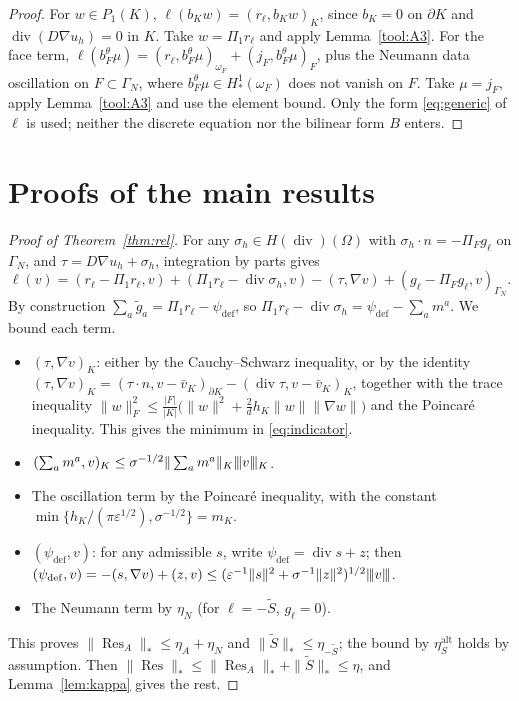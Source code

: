 \documentclass[11pt]{article}
\newcommand{\tnorm}[1]{\lvert\kern-0.25ex\lvert\kern-0.25ex\lvert #1\rvert\kern-0.25ex\rvert\kern-0.25ex\rvert}
\newcommand{\eps}{\varepsilon}
\newcommand{\Res}{\operatorname{Res}}
\newcommand{\Stil}{\tilde S}
\newcommand{\Hdiv}{H(\operatorname{div})}
\newcommand{\dv}{\operatorname{div}}
\newcommand{\defe}{\mathrm{def}}
\theoremstyle{plain}
\theoremstyle{remark}
\numberwithin{equation}{section}
\begin{document}
\begin{proof}
For $w\in P_1(K)$, $\ell(b_Kw)=(r_\ell,b_Kw)_K$, since $b_K=0$ on $\partial K$ and
$\dv(D\nabla u_h)=0$ in $K$. Take $w=\Pi_1r_\ell$ and apply Lemma~\ref{tool:A3}. For the face term,
$\ell(b_F^\theta\mu)=(r_\ell,b_F^\theta\mu)_{\omega_F}+(j_F,b_F^\theta\mu)_F$, plus the Neumann data
oscillation on $F\subset\Gamma_N$, where $b_F^\theta\mu\in H^1_*(\omega_F)$ does not vanish on $F$.
Take $\mu=j_F$, apply Lemma~\ref{tool:A3} and use the element bound. Only the form
\eqref{eq:generic} of $\ell$ is used; neither the discrete equation nor the bilinear form $B$ enters.
\end{proof}

\section{Proofs of the main results}\label{sec:proof}

\begin{proof}[Proof of Theorem~\ref{thm:rel}]
For any $\sigma_h\in\Hdiv(\Omega)$ with $\sigma_h\cdot n=-\Pi_F g_\ell$ on $\Gamma_N$, and
$\tau=D\nabla u_h+\sigma_h$, integration by parts gives
\[
  \ell(v)=(r_\ell-\Pi_1r_\ell,v)+(\Pi_1r_\ell-\dv\sigma_h,v)-(\tau,\nabla v)
  +(g_\ell-\Pi_Fg_\ell,v)_{\Gamma_N}.
\]
By construction $\sum_a\tilde g_a=\Pi_1r_\ell-\psi_\defe$, so
$\Pi_1r_\ell-\dv\sigma_h=\psi_\defe-\sum_am^a$. We bound each term.
\begin{itemize}
  \item $(\tau,\nabla v)_K$: either by the Cauchy--Schwarz inequality, or by the identity
  $(\tau,\nabla v)_K=(\tau\cdot n,v-\bar v_K)_{\partial K}-(\dv\tau,v-\bar v_K)_K$, together with the
  trace inequality $\|w\|_F^2\le\frac{|F|}{|K|}\bigl(\|w\|^2+\frac2d h_K\|w\|\|\nabla w\|\bigr)$ and
  the Poincar\'e inequality. This gives the minimum in \eqref{eq:indicator}.
  \item $(\sum_am^a,v)_K\le\sigma^{-1/2}\|\sum_am^a\|_K\tnorm{v}_K$.
  \item The oscillation term by the Poincar\'e inequality, with the constant
  $\min\{h_K/(\pi\eps^{1/2}),\sigma^{-1/2}\}=m_K$.
  \item $(\psi_\defe,v)$: for any admissible $s$, write $\psi_\defe=\dv s+z$; then
  $(\psi_\defe,v)=-(s,\nabla v)+(z,v)\le(\eps^{-1}\|s\|^2+\sigma^{-1}\|z\|^2)^{1/2}\tnorm{v}$.
  \item The Neumann term by $\eta_N$ (for $\ell=-\Stil$, $g_\ell=0$).
\end{itemize}
This proves $\|\Res_A\|_*\le\eta_A+\eta_N$ and $\|\Stil\|_*\le\eta_{-\Stil}$; the bound by
$\eta_S^{\mathrm{alt}}$ holds by assumption. Then
$\|\Res\|_*\le\|\Res_A\|_*+\|\Stil\|_*\le\eta$, and Lemma~\ref{lem:kappa} gives the rest.
\end{proof}
\end{document}
